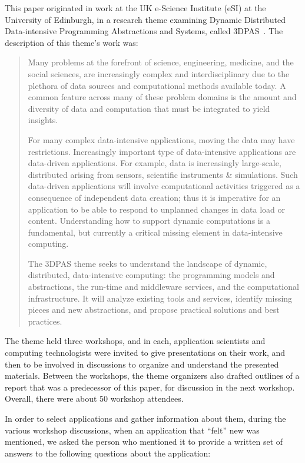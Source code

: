 This paper originated in work at the UK e-Science Institute (eSI) at
the University of Edinburgh, in a research theme examining Dynamic
Distributed Data-intensive Programming Abstractions and Systems,
called 3DPAS~\cite{3dpas-theme}.  The description of
this theme's work was:

\begin{quote}
Many problems at the forefront of science, engineering, medicine, and the social sciences, are increasingly complex and interdisciplinary due to the plethora of data sources and computational methods available today. A common feature across many of these problem domains is the amount and diversity of data and computation that must be integrated to yield insights.

For many complex data-intensive applications, moving the data may have restrictions. Increasingly important type of data-intensive applications are data-driven applications. For example, data is increasingly large-scale, distributed arising from sensors, scientific instruments \& simulations. Such data-driven applications will involve computational activities triggered as a consequence of independent data creation; thus it is imperative for an application to be able to respond to unplanned changes in data load or content. Understanding how to support dynamic computations is a fundamental, but currently a critical missing element in data-intensive computing.

The 3DPAS theme seeks to understand the landscape of dynamic, distributed, data-intensive computing: the programming models and abstractions, the run-time and middleware services, and the computational infrastructure. It will analyze existing tools and services, identify missing pieces and new abstractions, and propose practical solutions and best practices.
\end{quote}

The theme held three workshops, and in each, application scientists and computing technologists
were invited to give presentations on their work, and then to be involved in discussions to
organize and understand the presented materials.  Between the workshops, the theme
organizers also drafted outlines of a report that was a predecessor of this paper, for
discussion in the next workshop.  Overall, there were about 50 workshop attendees.

In order to select applications and gather information about
them, during the various workshop discussions, when an
application that ``felt'' new was mentioned, we asked the person who
mentioned it to provide a written set of answers to the following questions about the
application:

